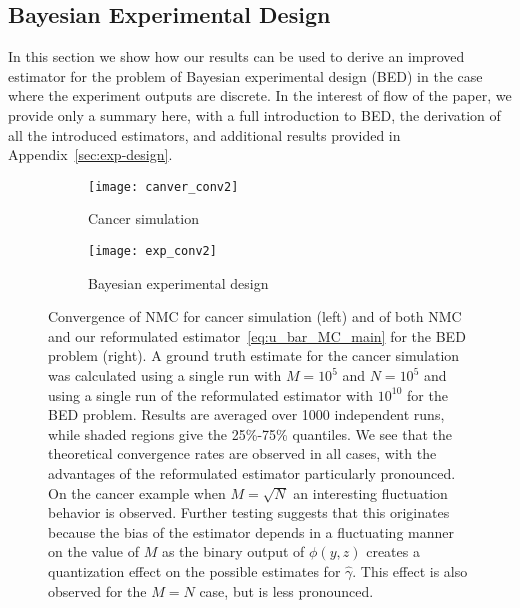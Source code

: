 \subsection{Bayesian Experimental Design}
\label{sec:bo-design}

In this section we show how our results can be used to derive an improved estimator for the problem of
Bayesian experimental design (BED) in the case where the experiment outputs are discrete.  
In the interest of flow of the paper, we provide only a summary here, with a full introduction to BED, the derivation of all
the introduced estimators, and additional results provided in Appendix~\ref{sec:exp-design}.

\begin{figure}[t]
	\centering
	\begin{subfigure}[b]{0.49\textwidth}
		\centering
		\texttt{[image: canver\_conv2]}
		\caption{Cancer simulation\label{fig:emperical-conv-cancer}}
	\end{subfigure}
	\begin{subfigure}[b]{0.49\textwidth}
		\centering
		\texttt{[image: exp\_conv2]}
		\caption{Bayesian experimental design\label{fig:exp-conv}}
	\end{subfigure}
	\caption{Convergence of NMC for cancer simulation (left) and of both NMC and our reformulated
		estimator~\eqref{eq:u_bar_MC_main} for the BED problem (right).
		A ground truth estimate for the cancer simulation was calculated
		using a single run with $M=10^5$ and $N=10^5$ and using a single run of the reformulated
		estimator with $10^{10}$ for the BED problem.
		Results are averaged over 1000 independent runs, while shaded regions give the 25\%-75\% quantiles. We
		see that the theoretical convergence rates are observed in all cases,
		with the advantages of the reformulated estimator particularly pronounced.
		On the cancer example when $M=\sqrt{N}$ an interesting fluctuation behavior is observed.  
		Further testing suggests that this originates because the bias of the estimator depends in
		a fluctuating manner on the value of $M$ as the binary output of $\phi(y,z)$ creates a quantization
		effect on the possible estimates for $\hat{\gamma}$.  This effect is also observed for the $M=N$ case,
		but is less pronounced. \vspace{-5pt}}
\end{figure}

